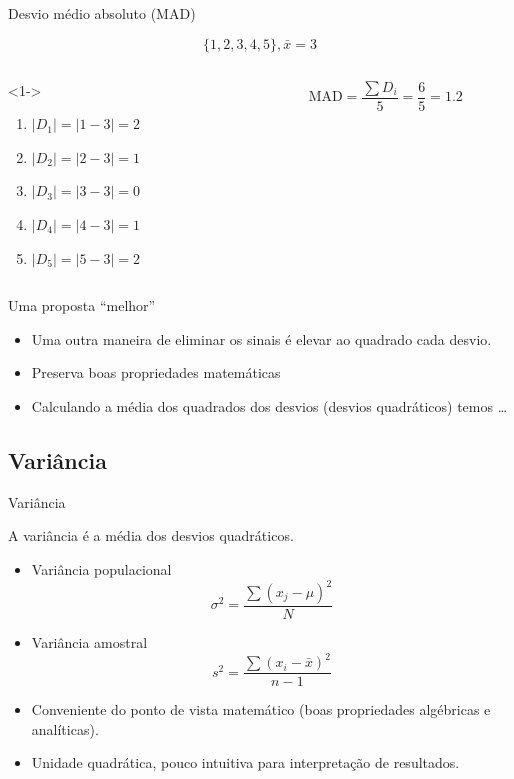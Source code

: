 \documentclass{beamer}
\begin{document}
\begin{frame}{Desvio médio absoluto (MAD)}
  \begin{example}
  \begin{displaymath}
    \{1,2,3,4,5\}, \bar{x} = 3
  \end{displaymath}
  \begin{columns}
    \begin{column}{5cm}<1->
      \begin{enumerate}
      \item $|D_1| = |1-3| = 2$
      \item $|D_2| = |2-3| = 1$
      \item $|D_3| = |3-3| = 0$
      \item $|D_4| = |4-3| = 1$
      \item $|D_5| = |5-3| = 2$
      \end{enumerate}
    \end{column}
    \begin{column}{5cm}
      \begin{displaymath}
        \mathrm{MAD } = \frac{\sum D_i}{5} = \frac{6}{5} = 1.2
      \end{displaymath}
    \end{column}
  \end{columns}
  \end{example}
\end{frame}

\begin{frame}{Uma proposta ``melhor''}
  \begin{itemize}
  \item Uma outra maneira de eliminar os sinais é elevar ao quadrado
    cada desvio.
  \item Preserva boas propriedades matemáticas
  \item Calculando a média dos quadrados dos desvios (desvios
    quadráticos) temos \ldots
  \end{itemize}
\end{frame}

\subsection{Variância}
\begin{frame}{Variância}
  \begin{definition}
    A variância é a média dos desvios quadráticos.
  \end{definition}
  \begin{itemize}
  \item Variância populacional
$$\sigma^2 = \frac{\sum (x_j - \mu)^2}{N}$$
\item Variância amostral
$$s^2 = \frac{\sum (x_i - \bar{x})^2}{n-1}$$
\item Conveniente do ponto de vista matemático (boas propriedades
  algébricas e analíticas).
\item Unidade quadrática, pouco intuitiva para interpretação de
  resultados.
  \end{itemize}
\end{frame}
\end{document}
